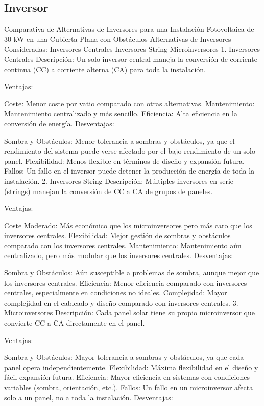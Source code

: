 \documentclass{article}
\begin{document}
\subsection*{Inversor}


Comparativa de Alternativas de Inversores para una Instalación Fotovoltaica de 30 kW en una Cubierta Plana con Obstáculos
Alternativas de Inversores Consideradas:
Inversores Centrales
Inversores String
Microinversores
1. Inversores Centrales
Descripción:
Un solo inversor central maneja la conversión de corriente continua (CC) a corriente alterna (CA) para toda la instalación.

Ventajas:

Coste: Menor coste por vatio comparado con otras alternativas.
Mantenimiento: Mantenimiento centralizado y más sencillo.
Eficiencia: Alta eficiencia en la conversión de energía.
Desventajas:

Sombra y Obstáculos: Menor tolerancia a sombras y obstáculos, ya que el rendimiento del sistema puede verse afectado por el bajo rendimiento de un solo panel.
Flexibilidad: Menos flexible en términos de diseño y expansión futura.
Fallos: Un fallo en el inversor puede detener la producción de energía de toda la instalación.
2. Inversores String
Descripción:
Múltiples inversores en serie (strings) manejan la conversión de CC a CA de grupos de paneles.

Ventajas:

Coste Moderado: Más económico que los microinversores pero más caro que los inversores centrales.
Flexibilidad: Mejor gestión de sombras y obstáculos comparado con los inversores centrales.
Mantenimiento: Mantenimiento aún centralizado, pero más modular que los inversores centrales.
Desventajas:

Sombra y Obstáculos: Aún susceptible a problemas de sombra, aunque mejor que los inversores centrales.
Eficiencia: Menor eficiencia comparado con inversores centrales, especialmente en condiciones no ideales.
Complejidad: Mayor complejidad en el cableado y diseño comparado con inversores centrales.
3. Microinversores
Descripción:
Cada panel solar tiene su propio microinversor que convierte CC a CA directamente en el panel.

Ventajas:

Sombra y Obstáculos: Mayor tolerancia a sombras y obstáculos, ya que cada panel opera independientemente.
Flexibilidad: Máxima flexibilidad en el diseño y fácil expansión futura.
Eficiencia: Mayor eficiencia en sistemas con condiciones variables (sombra, orientación, etc.).
Fallos: Un fallo en un microinversor afecta solo a un panel, no a toda la instalación.
Desventajas:
\end{document}
